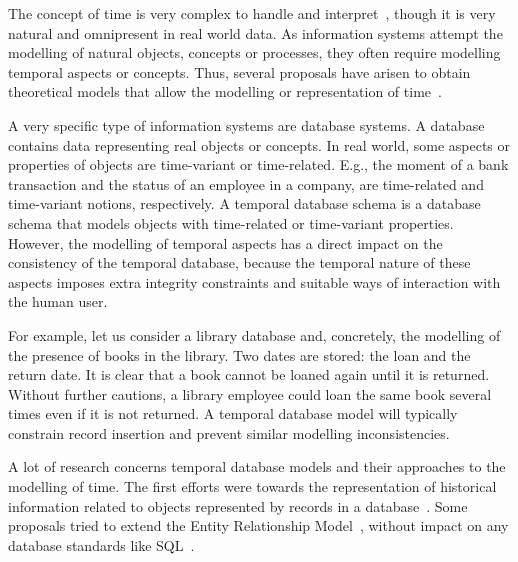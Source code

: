 %
%

The concept of time is very complex to handle and interpret~\cite{Klein1994,Shackle1961}, though it is very natural and omnipresent in real world data. As information systems attempt the modelling of natural objects, concepts or processes, they often require modelling temporal aspects or concepts. Thus, several proposals have arisen to obtain theoretical models that allow the modelling or representation of time~\cite{Bolour1982,VanderCruyssen1997}.

A very specific type of information systems are database systems. A database contains data representing real objects or concepts. In real world, some aspects or properties of objects are time-variant or time-related. E.g., the moment of a bank transaction and the status of an employee in a company, are time-related and time-variant notions, respectively.
A temporal database schema is a database schema that models objects with time-related or time-variant properties. However, the modelling of temporal aspects has a direct impact on the consistency of the temporal database, because the temporal nature of these aspects imposes extra integrity constraints and suitable ways of interaction with the human user. 


For example, let us consider a library database and, concretely, the modelling of the presence of books in the library. Two dates are stored: the loan and the return date. It is clear that a book cannot be loaned again until it is returned. Without further cautions, a library employee could loan the same book several times even if it is not returned. A temporal database model will typically constrain record insertion and prevent similar modelling inconsistencies.

A lot of research concerns temporal database models and their approaches to the modelling of time. The first efforts were towards the representation of historical information related to objects represented by records in a database~\cite{Clifford1985}. Some proposals tried to extend the Entity Relationship Model~\cite{Klopprogge1983}, without impact on any database standards like SQL~\cite{Sarda1990}.


